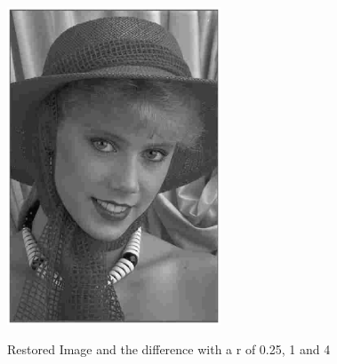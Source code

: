 \documentclass[paper=a4, fontsize=11pt]{scrartcl} %
\numberwithin{equation}{section} %
\numberwithin{figure}{section} %
\numberwithin{table}{section} %
\begin{document}
\begin{figure}[H]
{		\includegraphics[width=2.5in]{o4.eps}}
	\caption{Restored Image and the difference with a r of 0.25, 1 and 4}
	
\end{figure}
\end{document}

